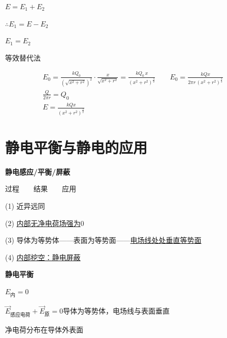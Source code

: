 $E=E_1+E_2$

$\therefore E_1=E-E_2$

$E_1=E_2$

等效替代法


\begin{gather*}
E_0=\frac{kQ_0}{\left(\sqrt{x^2+r^2}\right)^2}\cdot\frac{x}{\sqrt{x^2+r^2}}=\frac{kQ_0\,x}{(x^2+r^2)^{\frac32}}\qquad E_0=\frac{kQx}{2\pi r\,(x^2+r^2)^{\frac32}}\\
\frac{Q}{2\pi r}=Q_0\\
E=\frac{kQx}{(x^2+r^2)^{\frac32}}
\end{gather*}


\section{静电平衡与静电的应用}
\textbf{静电感应/平衡/屏蔽}

\noindent 过程　　结果　　应用
\noindent {}

\noindent (1) 近异远同

\noindent (2) \underline{内部无净电荷场强为$0$}

\noindent (3) 导体为等势体——表面为等势面——\underline{电场线处处垂直等势面}

\noindent (4) \underline{内部挖空：静电屏蔽}

\textbf{静电平衡}

$E_{\text{内}}=0$

$\vec{E}_{\text{感应电荷}}+\vec{E}_{\text{原}}=0$\qquad 导体为等势体，电场线与表面垂直

净电荷分布在导体外表面


